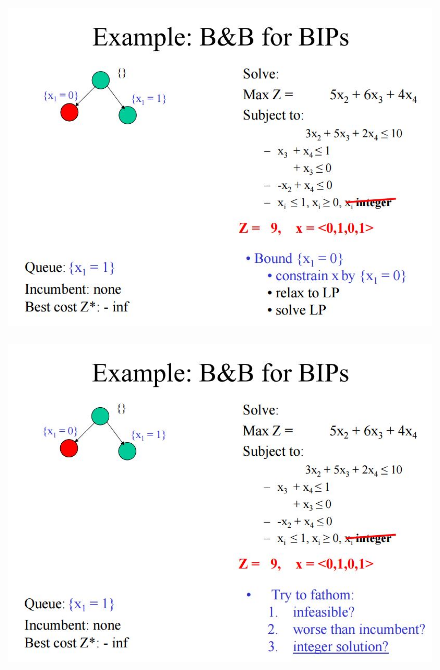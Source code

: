 \documentclass{beamer}
\begin{document}
\begin{frame}
	\begin{figure}
		\centering
		\includegraphics[width=1.0\linewidth]{BB-BIP/BB-BIP9}
	\end{figure}
\end{frame}
\begin{frame}
	\begin{figure}
		\centering
		\includegraphics[width=1.0\linewidth]{BB-BIP/BB-BIP10}
	\end{figure}
\end{frame}
\end{document}
